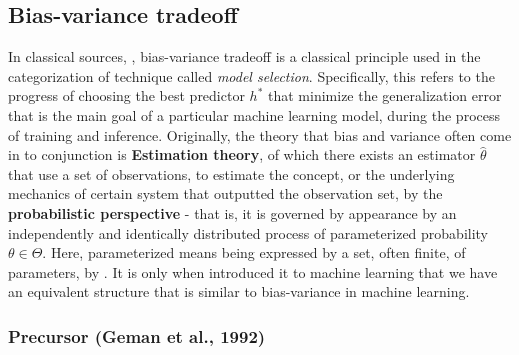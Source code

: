 \documentclass[10pt]{article} %
\begin{document}
\subsection{Bias-variance tradeoff}

In classical sources, \cite{gareth_james_introduction_2013,goodfellow2016deep,STL_Hajek_Maxim_2021,10.5555/2371238,10.5555/2621980}, bias-variance tradeoff is a classical principle used in the categorization of technique called \textit{model selection}. Specifically, this refers to the progress of choosing the best predictor $h^{*}$ that minimize the generalization error that is the main goal of a particular machine learning model, during the process of training and inference. Originally, the theory that bias and variance often come in to conjunction is \textbf{Estimation theory}, of which there exists an estimator $\hat{\theta}$ that use a set of observations, to estimate the concept, or the underlying mechanics of certain system that outputted the observation set, by the \textbf{probabilistic perspective} - that is, it is governed by appearance by an independently and identically distributed process of parameterized probability $\theta\in \Theta$. Here, parameterized means being expressed by a set, often finite, of parameters, by \cite{LehmannCasella_theory_1998,liam_statistics_2005}. It is only when \cite{6797087} introduced it to machine learning that we have an equivalent structure that is similar to bias-variance in machine learning. 

\subsubsection{Precursor (Geman et al., 1992)}
\end{document}
